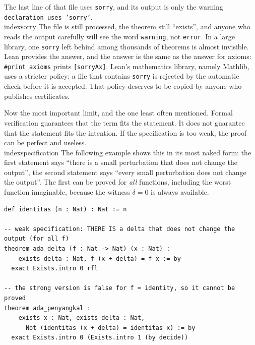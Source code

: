
The last line of that file uses \texttt{sorry}, and its output is only the warning
\texttt{declaration uses 'sorry'}.\\index{sorry} The file is still processed, the theorem still
``exists'', and anyone who reads the output carefully will see the word \texttt{warning}, not
\texttt{error}. In a large library, one \texttt{sorry} left behind among thousands of theorems is
almost invisible. Lean provides the answer, and the answer is the same as the answer for axioms:
\texttt{\#print axioms} prints \texttt{[sorryAx]}. Lean's mathematics library, namely Mathlib, uses
a stricter policy: a file that contains \texttt{sorry} is rejected by the automatic check before it
is accepted. That policy deserves to be copied by anyone who publishes certificates.


Now the most important limit, and the one least often mentioned. Formal verification guarantees that
the term fits the statement. It does not guarantee that the statement fits the intention. If the
specification is too weak, the proof can be perfect and useless.\\index{specification} The following
example shows this in its most naked form: the first statement says ``there is a small perturbation
that does not change the output'', the second statement says ``every small perturbation does not
change the output''. The first can be proved for \emph{all} functions, including the worst function
imaginable, because the witness $\delta=0$ is always available.

\begin{verbatim}
def identitas (n : Nat) : Nat := n

-- weak specification: THERE IS a delta that does not change the output (for all f)
theorem ada_delta (f : Nat -> Nat) (x : Nat) :
    exists delta : Nat, f (x + delta) = f x := by
  exact Exists.intro 0 rfl

-- the strong version is false for f = identity, so it cannot be proved
theorem ada_penyangkal :
    exists x : Nat, exists delta : Nat,
      Not (identitas (x + delta) = identitas x) := by
  exact Exists.intro 0 (Exists.intro 1 (by decide))
\end{verbatim}

